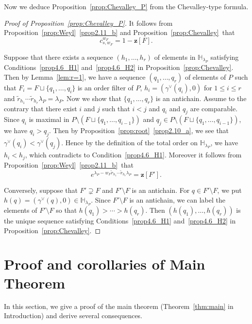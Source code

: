 \documentclass[10pt]{amsart}
\theoremstyle{definition}
\theoremstyle{remark}
\newcommand\vectz{\boldsymbol{z}}
\renewcommand\tilde{\widetilde}
\begin{document}
Now we deduce Proposition~\ref{prop:Chevalley_P} from the Chevalley-type formula.

\begin{proof}[Proof of Proposition~\ref{prop:Chevalley_P}]
It follows from Proposition~\ref{prop:Weyl}~\ref{prop2.11_b}
and Proposition~\ref{prop:Chevalley}~that
$$
c^{w_F}_{s, w_F} = 1 - \vectz[F].
$$

Suppose that there exists a sequence $(h_1, \ldots, h_r)$ of elements in $\mathbb{H}_{\lambda_P}$ 
satisfying Conditions~\ref{prop4.6_H1} and~\ref{prop4.6_H2} in Proposition~\ref{prop:Chevalley}.
Then by Lemma~\ref{lem:r=1}, we have a sequence $(q_1, \ldots, q_r)$ of elements of $P$ such that 
$F_i = F \sqcup \{ q_1, \ldots, q_i \}$ is an order filter of $P$, $h_i = (\gamma^\vee(q_i),0)$ 
for $1 \le i \le r$ and $\tilde{r}_{h_1} \cdots \tilde{r}_{h_r} \lambda_P = \lambda_P$.
Now we show that $\{ q_1, \ldots, q_r \}$ is an antichain.
Assume to the contrary that there exist $i$ and $j$ such that $i<j$ and $q_i$ and $q_j$ are comparable.
Since $q_i$ is maximal in $P \setminus (F \sqcup \{ q_1, \ldots, q_{i-1} \})$ 
and $q_j \in P \setminus (F \sqcup \{ q_1, \ldots, q_{i-1} \})$, 
we have $q_i > q_j$.
Then by Proposition~\ref{prop:root}~\ref{prop2.10_a}, we see that $\gamma^\vee(q_i) < \gamma^\vee(q_j)$.
Hence by the definition of the total order on $\mathbb{H}_{\lambda_P}$, we have $h_i < h_j$,
which contradicts to Condition~\ref{prop4.6_H1}.
Moreover it follows from Proposition~\ref{prop:Weyl}~\ref{prop2.11_b}~that
$$
e^{\lambda_P - w_F \tilde{r}_{h_1} \cdots \tilde{r}_{h_r} \lambda_P}
 = \vectz[F'].
$$

Conversely, suppose that $F' \supsetneq F$ and $F' \setminus F$ is an antichain.
For $q \in F' \setminus F$, we put $h(q) = (\gamma^\vee(q),0) \in \mathbb{H}_{\lambda_P}$.
Since $F' \setminus F$ is an antichain, we can label the elements of $F' \setminus F$ 
so that $h(q_1) > \cdots > h(q_r)$.
Then $(h(q_1), \ldots, h(q_r))$ is the unique sequence satisfying Conditions~\ref{prop4.6_H1} and~\ref{prop4.6_H2} 
in Proposition~\ref{prop:Chevalley}.
\end{proof}


\section{%
Proof and corollaries of Main Theorem
}\label{sect5}

In this section, we give a proof of the main theorem (Theorem~\ref{thm:main} in Introduction) 
and derive several consequences.
\end{document}
